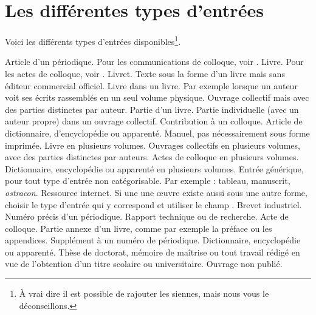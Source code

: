 \section{Les différentes types d'entrées}
Voici les différents types d'entrées disponibles\footnote{À vrai dire il est possible de rajouter les siennes, mais nous vous le déconseillons.}.


\begin{fieldlist}

Article d'un périodique. Pour les communications de colloque, voir .
Livre. Pour les actes de colloque, voir  . 
	Livret. Texte sous la forme d'un livre mais sans éditeur commercial officiel.
	Livre dans un livre. Par exemple lorsque un auteur  voit ses écrits rassemblés en un seul volume physique. 	
	Ouvrage collectif mais avec des parties distinctes par auteur.
	Partie d'un livre.
	Partie individuelle (avec un auteur propre) dans un ouvrage collectif.
	 Contribution à un colloque.
	 Article de dictionnaire, d'encyclopédie ou apparenté.
	 Manuel, pas nécessairement sous forme imprimée.
	 Livre en plusieurs volumes.
	 Ouvrages collectifs en plusieurs volumes, avec des parties distinctes par auteurs.
	 Actes de colloque en plusieurs volumes.
	 Dictionnaire, encyclopédie ou apparenté en plusieurs volumes.
	 Entrée générique, pour tout type d'entrée non catégorisable. Par exemple : tableau, manuscrit, \emph{ostracon}. 
	Ressource internet. Si une une œuvre existe aussi sous une autre forme, choisir le type d'entrée qui y correspond et utiliser le champ .
	Brevet industriel.
	Numéro précis d'un périodique.	
	Rapport technique ou de recherche.
	Acte de colloque.
	Partie annexe d'un livre, comme par exemple la préface ou les appendices.
	Supplément à un numéro de périodique.
	Dictionnaire, encyclopédie ou apparenté.
	Thèse de doctorat, mémoire de maîtrise ou tout travail rédigé en vue de l'obtention d'un titre scolaire ou universitaire.
	Ouvrage non publié.
\end{fieldlist}

